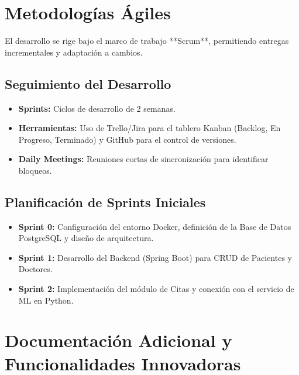 \documentclass[12pt, a4paper]{article}
\begin{document}
	\section{Metodologías Ágiles}
	
	El desarrollo se rige bajo el marco de trabajo **Scrum**, permitiendo entregas incrementales y adaptación a cambios.
	
	\subsection{Seguimiento del Desarrollo}
	\begin{itemize}
		\item \textbf{Sprints:} Ciclos de desarrollo de 2 semanas.
		\item \textbf{Herramientas:} Uso de Trello/Jira para el tablero Kanban (Backlog, En Progreso, Terminado) y GitHub para el control de versiones.
		\item \textbf{Daily Meetings:} Reuniones cortas de sincronización para identificar bloqueos.
	\end{itemize}
	
	\subsection{Planificación de Sprints Iniciales}
	\begin{itemize}
		\item \textbf{Sprint 0:} Configuración del entorno Docker, definición de la Base de Datos PostgreSQL y diseño de arquitectura.
		\item \textbf{Sprint 1:} Desarrollo del Backend (Spring Boot) para CRUD de Pacientes y Doctores.
		\item \textbf{Sprint 2:} Implementación del módulo de Citas y conexión con el servicio de ML en Python.
	\end{itemize}
	
	\section{Documentación Adicional y Funcionalidades Innovadoras}
	
\end{document}
